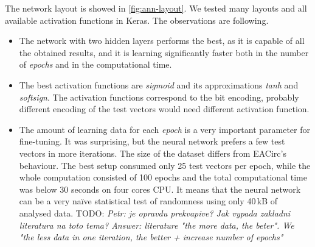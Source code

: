 \documentclass[
  print, %
  Table,   %
  nolof,     %
  nolot,     %
  11pt, %
  oneside  %
]{fithesis3}
\newcommand{\todo}[1]{TODO: \textit{#1}}
\begin{document}
The network layout is showed in \cref{fig:ann-layout}. We tested many layouts and all available activation functions in Keras. The observations are following.

\begin{itemize}
    \item The network with two hidden layers performs the best, as it is capable of all the obtained results, and it is learning significantly faster both in the number of \textit{epochs} and in the computational time.
    \item The best activation functions are \textit{sigmoid} and its approximations \textit{tanh} and \textit{softsign}. The activation functions correspond to the bit encoding, probably different encoding of the test vectors would need different activation function.
    \item The amount of learning data for each \textit{epoch} is a very important parameter for fine-tuning. It was surprising, but the neural network prefers a few test vectors in more iterations. The size of the dataset differs from EACirc's behaviour. The best setup consumed only 25 test vectors per epoch, while the whole computation consisted of 100 epochs and the total computational time was below 30 seconds on four cores CPU. It means that the neural network can be a very naïve statistical test of randomness using only 40\,kB of analysed data. \todo{Petr: je opravdu prekvapive? Jak vypada zakladni literatura na toto tema? Answer: literature "the more data, the beter". We "the less data in one iteration, the better + increase number of epochs"}
\end{itemize}
\end{document}
